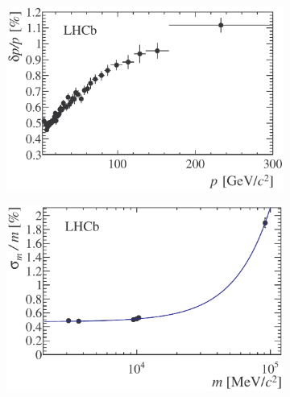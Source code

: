 \begin{figure}[tbp]
  \begin{subfigure}{0.49\textwidth}
    \includegraphics[width=\textwidth]{graphics/intro/dppVsp-crop-cmyk}
    \caption{}
    \label{fig:detPerf_momRes}
  \end{subfigure}%
  \hfill%
  \begin{subfigure}{0.49\textwidth}
    \includegraphics[width=\textwidth]{graphics/intro/relResolutionVsMass-crop-cmyk}
    \caption{}
    \label{fig:detPerf_massRes}
  \end{subfigure} \\

  \vspace*{0.01\textwidth}


\end{figure}
